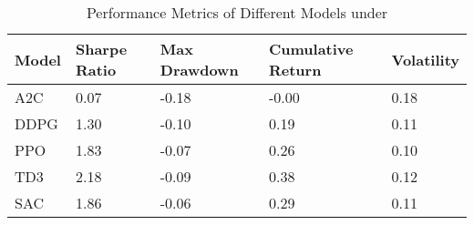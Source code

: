 \begin{table}[H]
\centering
\begin{tabular}{|l|l|l|l|l|}
\hline
Model & Sharpe Ratio & Max Drawdown & Cumulative Return & Volatility \\ \hline
A2C & 0.07 & -0.18 & -0.00 & 0.18 \\ \hline
DDPG & 1.30 & -0.10 & 0.19 & 0.11 \\ \hline
PPO & 1.83 & -0.07 & 0.26 & 0.10 \\ \hline
TD3 & 2.18 & -0.09 & 0.38 & 0.12 \\ \hline
SAC & 1.86 & -0.06 & 0.29 & 0.11 \\ \hline
\end{tabular}
\caption{Performance Metrics of Different Models under }
\label{tab:metrics}
\end{table}
